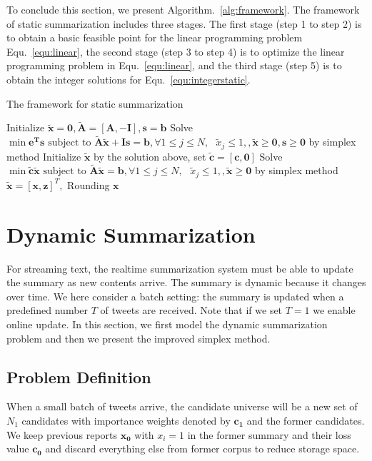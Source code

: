 \documentclass[envcountsame]{llncs}
\begin{document}
To conclude this section, we present Algorithm.~\ref{alg:framework}. The framework of static summarization includes three stages. The first stage (step 1 to step 2) is to obtain a basic feasible point for the linear programming problem Equ.~\ref{equ:linear}, the second stage (step 3 to step 4) is to optimize the linear programming problem in Equ.~\ref{equ:linear}, and the third stage (step 5) is to obtain the integer solutions for Equ.~\ref{equ:integerstatic}.

\vspace{-0.6cm}
\begin{algorithm}\label{alg:framework}
\caption{The framework for static summarization}

Initialize $\tilde{\mathbf{x}}=\mathbf{0},\tilde{\mathbf{A}}=[\mathbf{A},-\mathbf{I}],\mathbf{s}=\mathbf{b}$\;
Solve $\min \mathbf{e^{T}s} \textrm{ subject to } \tilde{\mathbf{A}}\tilde{\mathbf{x}} + \mathbf{Is} = \mathbf{b},  \forall 1\leq j\leq N,\textrm{ } \tilde{x}_j \leq 1, ,\tilde{\mathbf{x}}\geq \mathbf{0}, \mathbf{s}\geq \mathbf{0}$ by simplex method\;
Initialize $\tilde{\mathbf{x}}$ by the solution above, set $\tilde{\mathbf{c}}=[\mathbf{c},\mathbf{0}]$  \;
Solve $\min \tilde{\mathbf{c}}\tilde{\mathbf{x}}\textrm{ subject to } \tilde{\mathbf{A}}\tilde{\mathbf{x}} = \mathbf{b}, \forall 1\leq j\leq N,\textrm{ } \tilde{x}_j \leq 1, ,\tilde{\mathbf{x}}\geq \mathbf{0}$ by simplex method\;
$\tilde{\mathbf{x}}=[\mathbf{x},\mathbf{z}]^T,$ Rounding $\mathbf{x}$\;
\end{algorithm}
\vspace{-0.8cm}

\section{Dynamic Summarization}\label{sec:dynamic}
For streaming text, the realtime summarization system must be able to update the summary as new contents arrive. The summary is dynamic because it changes over time. We here consider a batch setting: the summary is updated when a predefined number $T$ of tweets are received. Note that if we set $T=1$ we enable online update.  In this section, we first model the dynamic summarization problem and then we present the improved simplex method.

\subsection{Problem Definition}
When a small batch of tweets arrive, the candidate universe will be a new set of $N_1 $ candidates with importance weights denoted by $\mathbf{c_1}$ and the former candidates. We keep previous reports $\mathbf{x_0}$ with $x_i=1$ in the former summary and their loss value $\mathbf{c_0}$  and discard everything else from former corpus to reduce storage space.
\end{document}

